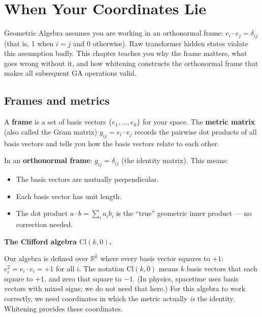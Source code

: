 \documentclass[11pt, twoside, openright]{memoir}
\newcommand{\ip}{\cdot}           %
\numberwithin{equation}{chapter}
\begin{document}
\chapter{When Your Coordinates Lie}
\label{chap:frames}

\begin{whycare}
Geometric Algebra assumes you are working in an orthonormal frame:
$e_i \ip e_j = \delta_{ij}$ (that is, 1 when $i = j$ and 0 otherwise).  Raw transformer hidden states violate
this assumption badly.  This chapter teaches you why the frame matters,
what goes wrong without it, and how whitening constructs the orthonormal
frame that makes all subsequent GA operations valid.
\end{whycare}

\section{Frames and metrics}

A \textbf{frame} is a set of basis vectors $\{e_1, \ldots, e_k\}$ for
your space.  The \textbf{metric matrix} (also called the Gram matrix) $g_{ij} = e_i \ip e_j$ records the pairwise dot products of all basis vectors and tells
you how the basis vectors relate to each other.

In an \textbf{orthonormal frame}: $g_{ij} = \delta_{ij}$ (the identity
matrix).  This means:
\begin{itemize}[nosep]
\item The basis vectors are mutually perpendicular.
\item Each basis vector has unit length.
\item The dot product $a \ip b = \sum_i a_i b_i$ is the ``true''
  geometric inner product --- no correction needed.
\end{itemize}

\begin{gabox}
\textbf{The Clifford algebra $\mathrm{Cl}(k, 0)$.}

Our algebra is defined over $\mathbb{R}^k$ where every basis vector
squares to $+1$: $e_i^2 = e_i \ip e_i = +1$ for all $i$.  The notation
$\mathrm{Cl}(k, 0)$ means $k$ basis vectors that each square to $+1$,
and zero that square to $-1$.  (In physics, spacetime uses basis vectors
with mixed signs; we do not need that here.)  For this algebra to work
correctly, we need coordinates in which the metric actually \emph{is}
the identity.  Whitening provides these coordinates.
\end{gabox}
\end{document}
